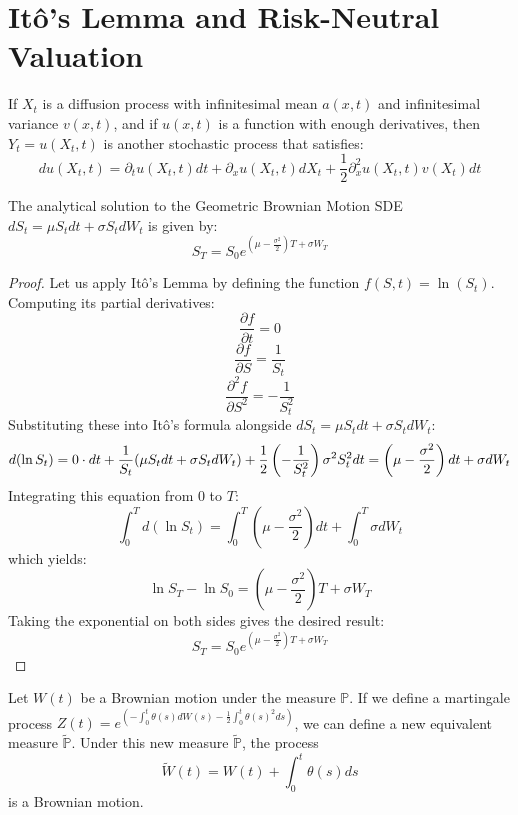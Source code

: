 \section{Itô's Lemma and Risk-Neutral Valuation}

\begin{theorem}
If \(X_t\) is a diffusion process with infinitesimal mean \(a(x, t)\) and infinitesimal variance \(v(x, t)\), and if \(u(x, t)\) is a function with enough derivatives, then \(Y_t = u(X_t, t)\) is another stochastic process that satisfies:
\begin{equation}
    du(X_t, t) = \partial_t u(X_t, t) dt + \partial_x u(X_t, t) dX_t + \frac{1}{2} \partial^2_x u(X_t, t) v(X_t) dt
\end{equation}
\end{theorem}

\begin{proposition}
The analytical solution to the Geometric Brownian Motion SDE \(dS_t = \mu S_t dt + \sigma S_t dW_t\) is given by:
\begin{equation}
    S_T = S_0 e^{\left( \mu - \frac{\sigma^2}{2} \right) T + \sigma W_T}
\end{equation}
\end{proposition}

\begin{proof}
Let us apply Itô's Lemma by defining the function \(f(S, t) = \ln(S_t)\). Computing its partial derivatives:
\[
    \frac{\partial f}{\partial t} = 0 
\]
\[
    \frac{\partial f}{\partial S} = \frac{1}{S_t} 
\]
\[
    \frac{\partial^2 f}{\partial S^2} = -\frac{1}{S_t^2}
\]
Substituting these into Itô's formula alongside \(dS_t = \mu S_t dt + \sigma S_t dW_t\):
\[
    d(\ln S_t) = 0 \cdot dt + \frac{1}{S_t} (\mu S_t dt + \sigma S_t dW_t) + \frac{1}{2} \left(-\frac{1}{S_t^2}\right) \sigma^2 S_t^2 dt \\
    = \left( \mu - \frac{\sigma^2}{2} \right) dt + \sigma dW_t
\]
Integrating this equation from \(0\) to \(T\):
\[
    \int_0^T d(\ln S_t) = \int_0^T \left( \mu - \frac{\sigma^2}{2} \right) dt + \int_0^T \sigma dW_t
\]
which yields:
\[
    \ln S_T - \ln S_0 = \left( \mu - \frac{\sigma^2}{2} \right) T + \sigma W_T
\]
Taking the exponential on both sides gives the desired result:
\[
    S_T = S_0 e^{\left( \mu - \frac{\sigma^2}{2} \right) T + \sigma W_T}
\]
\end{proof}

\begin{theorem}
Let \(W(t)\) be a Brownian motion under the measure \(\mathbb{P}\). If we define a martingale process \(Z(t) = e^{\left( - \int_0^t \theta(s) dW(s) - \frac{1}{2} \int_0^t \theta(s)^2 ds \right)}\), we can define a new equivalent measure \(\tilde{\mathbb{P}}\). Under this new measure \(\tilde{\mathbb{P}}\), the process
\[
    \tilde{W}(t) = W(t) + \int_0^t \theta(s) ds
\]
is a Brownian motion.
\end{theorem}

